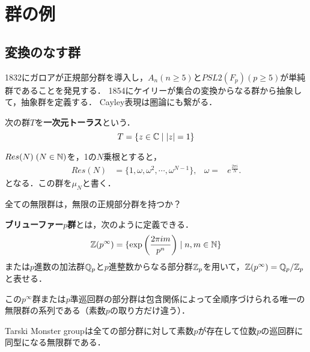 \documentclass[uplatex,dvipdfmx]{jsreport}
\begin{document}
\section{群の例}

\subsection{変換のなす群}

\begin{history}
    1832にガロアが正規部分群を導入し，$A_n(n\ge 5)$と$PSL2(F_p)(p \ge 5)$が単純群であることを発見する．
    1854にケイリーが集合の変換からなる群から抽象して，抽象群を定義する．
    Cayley表現は圏論にも繋がる．
\end{history}

\begin{example}[1-torus]
    次の群$T$を\textbf{一次元トーラス}という．
    \[ T=\{ z\in \mathbb{C}\mid |z|=1 \} \]
\end{example}

\begin{example}
    $Res(N)\;(N\in\mathbb{N})$を，1の$N$乗根とすると，
    \begin{align*}
        Res(N)&=\{1,\omega,\omega^2,\cdots,\omega^{N-1}\},&\omega=&e^{\frac{2\pi i}{N}}.
    \end{align*}
    となる．この群を$\mu_N$と書く．
\end{example}

\begin{question}
    全ての無限群は，無限の正規部分群を持つか？
\end{question}
\begin{counterexample}
    \textbf{ブリューファー$p$群}とは，次のように定義できる．
    \begin{align*}
        \mathbb{Z}(p^\infty) = \{ \exp\left(\frac{2\pi im}{p^n}\right)\mid n,m\in\mathbb{N} \}
    \end{align*}
    または$p$進数の加法群$\mathbb{Q}_p$と$p$進整数からなる部分群$\mathbb{Z}_p$を用いて，$\mathbb{Z}(p^\infty)=\mathbb{Q}_p/\mathbb{Z}_p$と表せる．

    この$p^\infty$群または$p$準巡回群の部分群は包含関係によって全順序づけられる唯一の無限群の系列である（素数$p$の取り方だけ違う）．
\end{counterexample}
\begin{counterexample}
    Tarski Monster groupは全ての部分群に対して素数$p$が存在して位数$p$の巡回群に同型になる無限群である．
\end{counterexample}
\end{document}
